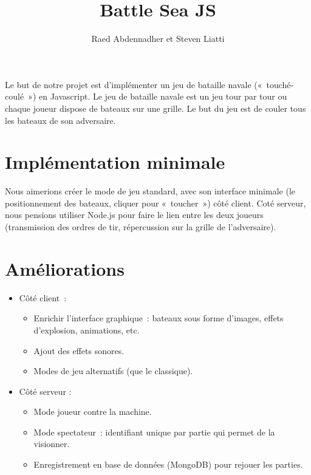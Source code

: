 \documentclass[a4paper, 11pt]{article}
\begin{document}
\title{Battle Sea JS} 
\author{Raed Abdennadher et Steven Liatti} 
\maketitle

\noindent
Le but de notre projet est d’implémenter un jeu de bataille navale (« touché-coulé ») en Javascript. Le jeu de bataille navale est un jeu tour par tour ou chaque joueur dispose de bateaux sur une grille. Le but du jeu est de couler tous les bateaux de son adversaire.

\section*{Implémentation minimale}
\noindent
Nous aimerions créer le mode de jeu standard, avec son interface minimale (le positionnement des bateaux, cliquer pour « toucher ») côté client. Coté serveur, nous pensions utiliser Node.js pour faire le lien entre les deux joueurs (transmission des ordres de tir, répercussion sur la grille de l’adversaire).

\section*{Améliorations}
\noindent

\begin{itemize}
	\item Côté client :
	\begin{itemize}
		\item Enrichir l’interface graphique : bateaux sous forme d’images, effets d’explosion, animations, etc.
		\item Ajout des effets sonores.
		\item Modes de jeu alternatifs (que le classique).
	\end{itemize}
	\item Côté serveur :
	\begin{itemize}
		\item Mode joueur contre la machine.
		\item Mode spectateur : identifiant unique par partie qui permet de la visionner.
		\item Enregistrement en base de données (MongoDB) pour rejouer les parties.
	\end{itemize}
\end{itemize}
\end{document}
